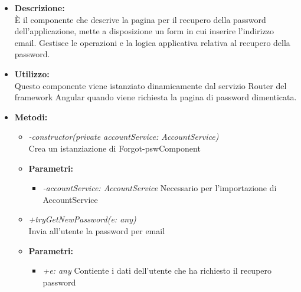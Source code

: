 \begin{itemize}
	\item \textbf{Descrizione:}\\
	È il componente che descrive la pagina per il recupero della password dell'applicazione, mette a disposizione un form in cui inserire l'indirizzo email. Gestisce le operazioni e la logica applicativa relativa al recupero della password.
	\item \textbf{Utilizzo:}\\
	Questo componente viene istanziato dinamicamente dal servizio Router del framework Angular quando viene richiesta la pagina di password dimenticata.
	\item \textbf{Metodi:}
		\begin{itemize}
			\item \emph{-constructor(private accountService: AccountService)}\\
    	Crea un istanziazione di Forgot-pswComponent
    	\item \textbf{Parametri:}
    		\begin{itemize}
    			\item \emph{-accountService: AccountService}
    			Necessario per l'importazione di AccountService
    		\end{itemize}
    		\item \emph{+tryGetNewPassword(e: any)}\\
    		Invia all'utente la password per email
    	\item \textbf{Parametri:}
    		\begin{itemize}
    			\item \emph{+e: any}
    			Contiente i dati dell'utente che ha richiesto il recupero password
    		\end{itemize}
		\end{itemize}
\end{itemize}